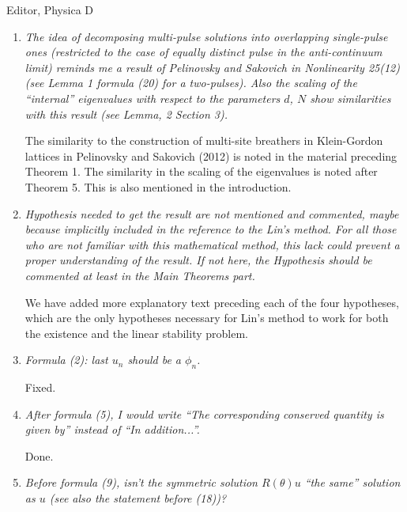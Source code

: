 \documentclass[11pt]{letter}
\begin{document}
\begin{letter}{Editor, Physica D}
\begin{enumerate}
\item \emph{The idea of decomposing multi-pulse solutions into overlapping single-pulse ones (restricted to the case of equally distinct pulse in the anti-continuum limit) reminds me a result of Pelinovsky and Sakovich in Nonlinearity 25(12) (see Lemma 1 formula (20) for a two-pulses). Also the scaling of the ``internal'' eigenvalues with respect to the parameters $d$, $N$ show similarities with this result (see Lemma, 2 Section 3).}

\vspace{4mm}
The similarity to the construction of multi-site breathers in Klein-Gordon lattices in Pelinovsky and Sakovich (2012) is noted in the material preceding Theorem 1. The similarity in the scaling of the eigenvalues is noted after Theorem 5. This is also mentioned in the introduction.
\vspace{4mm}

\item \emph{Hypothesis needed to get the result are not mentioned and commented, maybe because implicitly included in the reference to the Lin’s method. For all those who are not familiar with this mathematical method, this lack could prevent a proper understanding of the result. If not here, the Hypothesis should be commented at least in the Main Theorems part.}

\vspace{4mm}
We have added more explanatory text preceding each of the four hypotheses, which are the only hypotheses necessary for Lin's method to work for both the existence and the linear stability problem.
\vspace{4mm}

\item \emph{Formula (2): last $u_n$ should be a $\phi_n$.}

\vspace{4mm}
Fixed.
\vspace{4mm}

\item \emph{After formula (5), I would write ``The corresponding conserved quantity is given by''
instead of ``In addition...''.}

\vspace{4mm}
Done.
\vspace{4mm}

\item \emph{Before formula (9), isn’t the symmetric solution $R(\theta)u$ ``the same'' solution as $u$ (see also the statement before (18))?}


\end{enumerate}
\end{letter}
\end{document}

